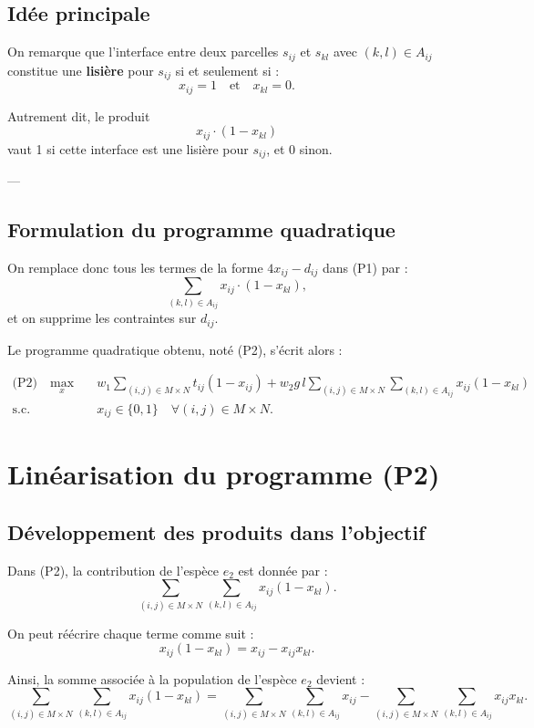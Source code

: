 \documentclass[a4paper,11pt]{article}
\begin{document}
\subsection{Idée principale}

On remarque que l'interface entre deux parcelles $s_{ij}$ et $s_{kl}$ avec $(k,l)\in A_{ij}$ constitue une \textbf{lisière} pour $s_{ij}$ si et seulement si :
\[
x_{ij} = 1 \quad \text{et} \quad x_{kl} = 0.
\]

Autrement dit, le produit
\[
x_{ij} \cdot (1 - x_{kl})
\]
vaut 1 si cette interface est une lisière pour $s_{ij}$, et 0 sinon.

---

\subsection{Formulation du programme quadratique}

On remplace donc tous les termes de la forme $4x_{ij} - d_{ij}$ dans (P1) par :
\[
\sum_{(k,l) \in A_{ij}} x_{ij} \cdot (1 - x_{kl}),
\]
et on supprime les contraintes sur $d_{ij}$.  

Le programme quadratique obtenu, noté (P2), s'écrit alors :

\begin{align*}
\text{(P2)} \quad 
\max_{x} \quad & w_1 \sum_{(i,j)\in M\times N} t_{ij}(1 - x_{ij}) 
+ w_2 g \, l \sum_{(i,j)\in M\times N} \sum_{(k,l)\in A_{ij}} x_{ij} (1 - x_{kl}) \\
\text{s.c.} \quad & x_{ij} \in \{0,1\} \quad \forall (i,j)\in M\times N.
\end{align*}

\section{Linéarisation du programme (P2)}

\subsection{Développement des produits dans l'objectif}

Dans (P2), la contribution de l'espèce $e_2$ est donnée par :
\[
\sum_{(i,j)\in M\times N} \sum_{(k,l)\in A_{ij}} x_{ij} (1 - x_{kl}).
\]

On peut réécrire chaque terme comme suit :
\[
x_{ij} (1 - x_{kl}) = x_{ij} - x_{ij} x_{kl}.
\]

Ainsi, la somme associée à la population de l'espèce $e_2$ devient :
\[
\sum_{(i,j)\in M\times N} \sum_{(k,l)\in A_{ij}} x_{ij} (1 - x_{kl}) 
= \sum_{(i,j)\in M\times N} \sum_{(k,l)\in A_{ij}} x_{ij} - \sum_{(i,j)\in M\times N} \sum_{(k,l)\in A_{ij}} x_{ij} x_{kl}.
\]
\end{document}

